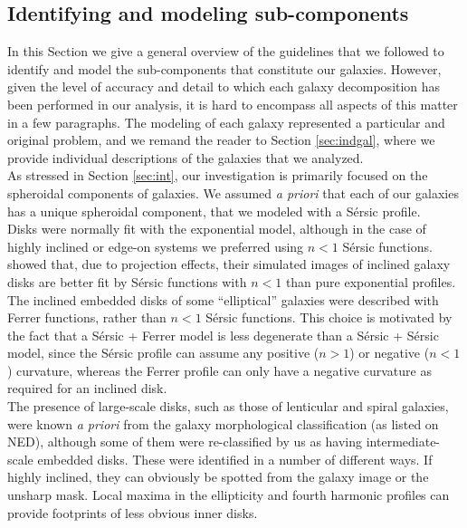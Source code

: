\documentclass[preprint2]{emulateapj}
\begin{document}
\subsection{Identifying and modeling sub-components}
\label{sec:cpts}
In this Section we give a general overview of the guidelines that we followed to identify and model 
the sub-components that constitute our galaxies. 
However, given the level of accuracy and detail to which each galaxy decomposition has been performed in our analysis,
it is hard to encompass all aspects of this matter in a few paragraphs.
The modeling of each galaxy represented a particular and original problem, 
and we remand the reader to Section \ref{sec:indgal},
where we provide individual descriptions of the galaxies that we analyzed. \\
As stressed in Section \ref{sec:int}, our investigation is primarily focused on the spheroidal components 
of galaxies.
We assumed \emph{a priori} that each of our galaxies has a unique spheroidal component, 
that we modeled with a S\'ersic profile. \\
Disks were normally fit with the exponential model, 
although in the case of highly inclined or edge-on systems we preferred using $n < 1$ S\'ersic functions. 
\citet{pastrav2013a,pastrav2013b} showed that, due to projection effects, their simulated images of inclined galaxy disks 
are better fit by S\'ersic functions with $n < 1$ than pure exponential profiles.
The inclined embedded disks of some ``elliptical'' galaxies were described with Ferrer functions, rather than $n < 1$ S\'ersic functions. 
This choice is motivated by the fact that a S\'ersic + Ferrer model is less degenerate than a S\'ersic + S\'ersic model, 
since the S\'ersic profile can assume any positive ($n > 1$) or negative ($n < 1$) curvature, 
whereas the Ferrer profile can only have a negative curvature as required for an inclined disk. \\
The presence of large-scale disks, such as those of lenticular and spiral galaxies, 
were known \emph{a priori} from the galaxy morphological classification (as listed on NED), 
although some of them were re-classified by us as having intermediate-scale embedded disks.
These were identified in a number of different ways. 
If highly inclined, they can obviously be spotted from the galaxy image or the unsharp mask.
Local maxima in the ellipticity and fourth harmonic profiles 
can provide footprints of less obvious inner disks.
\end{document}
